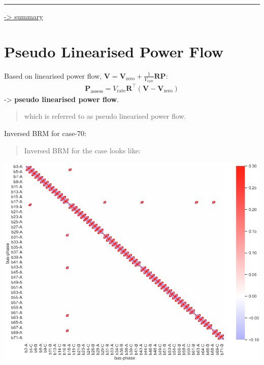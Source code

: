 \documentclass[
]{book}
\begin{document}
\begin{center}\rule{0.5\linewidth}{0.5pt}\end{center}

\protect\hyperlink{summary}{-\textgreater{} summary}

\hypertarget{brmInv}{%
\section{Pseudo Linearised Power Flow}\label{brmInv}}

Based on linearised power flow, \(\boldsymbol{V} = \boldsymbol{V}_\text{zero} + \frac{1}{V_\text{rate}} \boldsymbol{R} \boldsymbol{P}\):
\[ \begin{aligned}
    \boldsymbol{P}_\text{assess} =
    V_\text{rate} \boldsymbol{R}^{\top}
    \left( \boldsymbol{V} - \boldsymbol{V}_\text{zero} \right)
\end{aligned} \]
-\textgreater{} \textbf{pseudo linearised power flow}.

\begin{quote}
which is referred to as pseudo linearised power flow.
\end{quote}

Inversed BRM for case-70:

\begin{quote}
Inversed BRM for the case looks like:
\end{quote}

\begin{center}\includegraphics{Pictures/figHeatmapBrmInv} \end{center}
\end{document}
